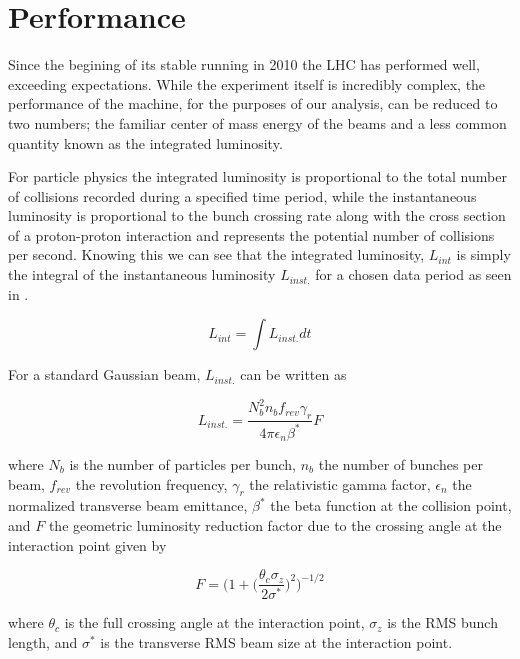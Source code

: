\section{Performance} \label{sec:lhc:performance}

Since the begining of its stable running in 2010 the LHC has performed well,
exceeding expectations.  While the experiment itself is incredibly complex, the
performance of the machine, for the purposes of our analysis, can be reduced to
two numbers; the familiar center of mass energy of the beams and a less common
quantity known as the integrated luminosity.  

For particle physics the integrated luminosity is proportional to the total
number of collisions recorded during a specified time period, while the
instantaneous luminosity is proportional to the bunch crossing rate along with
the cross section of a proton-proton interaction and represents the potential
number of collisions per second.  Knowing this we can see that the integrated
luminosity, $L_{int}$ is simply the integral of the instantaneous luminosity
$L_{inst.}$ for a chosen data period as seen in
.

\begin{equation} \label{eq:integrated_luminosity}
   L_{int} = \int L_{inst.}dt 
\end{equation}

For a standard Gaussian beam, $L_{inst.}$ can be written as

\begin{equation}
  L_{inst.} = \frac{N_{b}^{2}n_{b}f_{rev}\gamma_{r}}{4\pi\epsilon_{n}\beta^{*}}F
\end{equation}

where $N_{b}$ is the number of particles per bunch, $n_{b}$ the number of
bunches per beam, $f_{rev}$ the revolution frequency, $\gamma_{r}$ the
relativistic gamma factor, $\epsilon_{n}$ the normalized transverse beam
emittance, $\beta^{*}$ the beta function at the collision point, and $F$ the
geometric luminosity reduction factor due to the crossing angle at the
interaction point given by

\begin{equation}
  F = \bigg(1 + \Big( \frac{\theta_{c}\sigma_{z}}{2\sigma^{*}} \Big) ^{2}
\bigg)^{-1/2} 
\end{equation}

where $\theta_{c}$ is the full crossing angle at the interaction point,
$\sigma_{z}$ is the RMS bunch length, and $\sigma^{*}$ is the transverse RMS
beam size at the interaction point.


